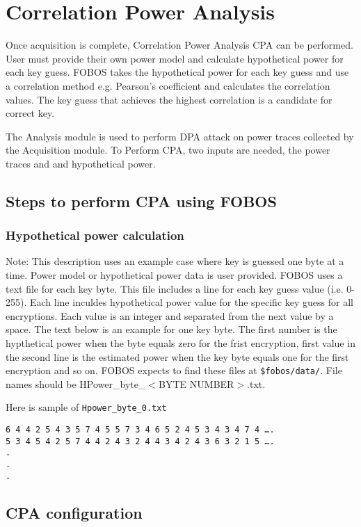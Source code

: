 \chapter{Correlation Power Analysis} \label{chap:fobos-cpa}

Once acquisition is complete, Correlation Power Analysis CPA can be performed.
User must provide their own power model and calculate hypothetical power for each key guess.
FOBOS takes the hypothetical power for each key guess and use a correlation method e.g. Pearson’s coefficient and calculates the correlation values.
The key guess that achieves the highest correlation is a candidate for correct key.

The Analysis module is used to perform DPA attack on power traces collected by the Acquisition
module. To Perform CPA, two inputs are needed, the power traces and and hypothetical power.


\section{Steps to perform CPA using FOBOS}
\subsection{Hypothetical power calculation}
Note: This description uses an example case where key is guessed one byte at a time. \newline
Power model or hypothetical power data is user provided. FOBOS uses a text file for each key
byte. This file includes a line for each key guess value (i.e. 0-255). Each line inculdes hypothetical
power value for the specific key guess for all encryptions. Each value is an integer and separated
from the next value by a space. The text below is an example for one key byte. The first number is the
hypthetical power when the byte equals zero for the frist encryption, first value in the second line is
the estimated power when the key byte equals one for the first encryption and so on.
FOBOS expects to find these files at \texttt{\$fobos/data/}. File names should be HPower\_byte\_$<$BYTE NUMBER$>$.txt.

Here is sample of \texttt{Hpower\_byte\_0.txt}

\begin{verbatim}
6 4 4 2 5 4 3 5 7 4 5 5 7 3 4 6 5 2 4 5 3 4 3 4 7 4 ….
5 3 4 5 4 2 5 7 4 4 2 4 3 2 4 4 3 4 2 4 3 6 3 2 1 5 ….
.
.
.
\end{verbatim}

\section{CPA configuration}

